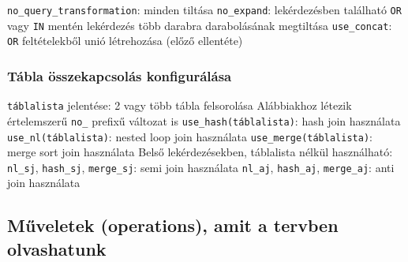 \documentclass[12pt,a4paper]{article}
\begin{document}
\begin{outline}
	\1 \texttt{no\_query\_transformation}: minden tiltása
	\1 \texttt{no\_expand}: lekérdezésben található \texttt{OR} vagy \texttt{IN} mentén lekérdezés több darabra darabolásának megtiltása
	\1 \texttt{use\_concat}: \texttt{OR} feltételekből unió létrehozása (előző ellentéte)
\end{outline}

\subsubsection{Tábla összekapcsolás konfigurálása}

\begin{outline}
	\1 \texttt{táblalista} jelentése: 2 vagy több tábla felsorolása
	\1 Alábbiakhoz létezik értelemszerű \texttt{no\_} prefixű változat is
	\1 \texttt{use\_hash(táblalista)}: hash join használata
	\1 \texttt{use\_nl(táblalista)}: nested loop join használata
	\1 \texttt{use\_merge(táblalista)}: merge sort join használata
	\1 Belső lekérdezésekben, táblalista nélkül használható:
		\2 \texttt{nl\_sj}, \texttt{hash\_sj}, \texttt{merge\_sj}: semi join használata
		\2 \texttt{nl\_aj}, \texttt{hash\_aj}, \texttt{merge\_aj}: anti join használata
\end{outline}

\subsection{Műveletek (operations), amit a tervben olvashatunk}
\end{document}
